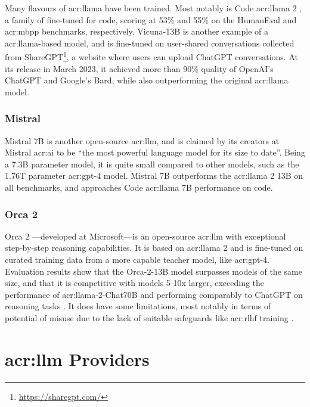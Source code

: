 Many flavours of \acrshort{acr:llama} have been trained. Most notably is Code \acrshort{acr:llama} 2 \citep{roziereCodeLlamaOpen2023}, a family of  fine-tuned for code, scoring at 53\% and 55\% on the HumanEval and \gls{acr:mbpp} benchmarks, respectively. Vicuna-13B is another example of a \acrshort{acr:llama}-based model, and is fine-tuned on user-shared conversations collected from ShareGPT\footnote{\url{https://sharegpt.com/}}, a website where users can upload ChatGPT conversations. At its release in March 2023, it achieved more than 90\% quality of OpenAI's ChatGPT and Google's Bard, while also outperforming the original \acrshort{acr:llama} model.

\subsubsection{Mistral}

Mistral 7B \citep{mistralaiMistral7B2023} is another open-source \acrshort{acr:llm}, and is claimed by its creators at Mistral \acrshort{acr:ai} to be \enquote{the most powerful language model for its size to date}. Being a 7.3B parameter model, it is quite small compared to other models, such as the 1.76T parameter \acrshort{acr:gpt}-4 model. Mistral 7B outperforms the \acrshort{acr:llama} 2 13B on all benchmarks, and approaches Code \acrshort{acr:llama} 7B performance on code.

\subsubsection{Orca 2}

Orca 2 \citep{mitraOrcaTeachingSmall2023}---developed at Microsoft---is an open-source \acrshort{acr:llm} with exceptional step-by-step reasoning capabilities. It is based on \acrshort{acr:llama} 2 and is fine-tuned on curated training data from a more capable teacher model, like \acrshort{acr:gpt}-4. Evaluation results show that the Orca-2-13B model surpasses models of the same size, and that it is competitive with models 5-10x larger, exceeding the performance of \acrshort{acr:llama}-2-Chat70B and performing comparably to ChatGPT on reasoning tasks \citep[11-12]{mitraOrcaTeachingSmall2023}. It does have some limitations, most notably in terms of potential of misuse due to the lack of suitable safeguards like \gls{acr:rlhf} training \citep[21]{mitraOrcaTeachingSmall2023}.



\section[Large Language Model Providers]{\acrlong{acr:llm} Providers}\label{sec:llm-providers}

